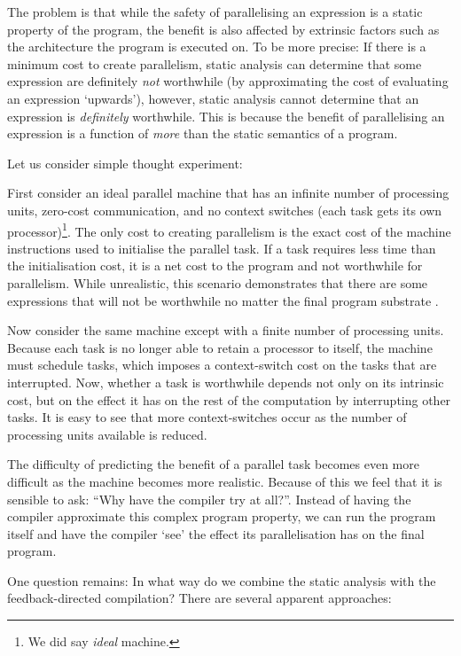 The problem is that while the safety of parallelising an expression is a static
property of the program, the benefit is also affected by extrinsic factors such
as the architecture the program is executed on. To be more precise: If there is
a minimum cost to create parallelism, static analysis can determine that some
expression are definitely \emph{not} worthwhile (by approximating the cost of
evaluating an expression `upwards'), however, static analysis cannot determine
that an expression is \emph{definitely} worthwhile. This is because the benefit
of parallelising an expression is a function of \emph{more} than the static
semantics of a program.

Let us consider simple thought experiment:

First consider an ideal parallel machine that has an infinite number of
processing units, zero-cost communication, and no context switches (each task
gets its own processor)\footnote{We did say \emph{ideal} machine.}. The only
cost to creating parallelism is the exact cost of the machine instructions used
to initialise the parallel task. If a task requires less time than the
initialisation cost, it is a net cost to the program and not worthwhile for
parallelism. While unrealistic, this scenario demonstrates that there are some
expressions that will not be worthwhile no matter the final program substrate
.

Now consider the same machine except with a finite number of processing units.
Because each task is no longer able to retain a processor to itself, the machine
must schedule tasks, which imposes a context-switch cost on the tasks that
are interrupted. Now, whether a task is worthwhile depends not only on its
intrinsic cost, but on the effect it has on the rest of the computation by
interrupting other tasks. It is easy to see that more context-switches occur
as the number of processing units available is reduced.

The difficulty of predicting the benefit of a parallel task becomes even more
difficult as the machine becomes more realistic. Because of this we feel that
it is sensible to ask: ``Why have the compiler try at all?''. Instead of
having the compiler approximate this complex program property, we can run
the program itself and have the compiler `see' the effect its parallelisation
has on the final program.

One question remains: In what way do we combine the static analysis with the
feedback-directed compilation? There are several apparent approaches:


